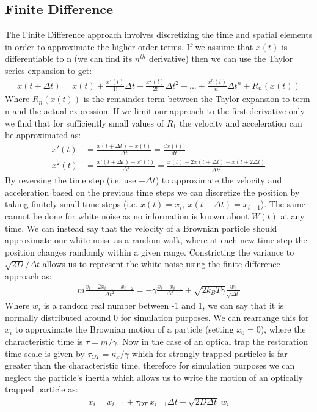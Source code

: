 \subsection{Finite Difference}
The Finite Difference approach involves discretizing the time and spatial elements in order to approximate the higher order terms. If we assume that $x(t)$ is differentiable to n (we can find its $n^{th}$ derivative) then we can use the Taylor series expansion to get:
\begin{align}
	x(t+\Delta t) = x(t)+\frac{x'(t)}{1!}\Delta t + \frac{x^2(t)}{2!}\Delta t^2+...+\frac{x^n(t)}{n!}\Delta t^n+R_n(x(t))	
\end{align}
Where $R_n(x(t))$ is the remainder term between the Taylor expansion to term n and the actual expression. If we limit our approach to the first derivative only we find that for sufficiently small values of $R_1$ the velocity and acceleration can be approximated as:
\begin{align}
	x'(t) &= \frac{x(t+\Delta t)-x(t)}{\Delta t}=\frac{dx(t))}{dt} \\
	x^2(t) &= \frac{x'(t+\Delta t)-x'(t)}{\Delta t} = \frac{x(t)-2x(t+\Delta t)+x(t+2\Delta t)}{\Delta t^2}
\end{align}
By reversing the time step (i.e. use $-\Delta t$) to approximate the velocity and acceleration based on the previous time steps we can discretize the position by taking finitely small  time steps (i.e. $x(t) = x_i,\ x(t-\Delta t) = x_{i-1}$). The same cannot be done for white noise as no information is known about $W(t)$ at any time. We can instead say that the velocity of a Brownian particle should approximate our white noise as a random walk, where at each new time step the position changes randomly within a given range. Constricting the variance to $\sqrt{2D}/\Delta t$ allows us to represent the white noise using the finite-difference approach as:
\begin{align}
	m\frac{x_i-2x_{i-1}+x_{i-2}}{\Delta t^2} = -\gamma\frac{x_i-x_{i-1}}{\Delta t}+\sqrt{2k_BT\gamma}\frac{w_i}{\sqrt{\Delta t}}
\end{align}
Where $w_i$ is a random real number between -1 and 1, we can say that it is normally distributed around 0 for simulation purposes. We can rearrange this for $x_i$ to approximate the Brownian motion of a particle (setting $x_0=0$), where the characteristic time is $\tau = m/\gamma$. Now in the case of an optical trap the restoration time scale is given by $\tau_{OT}=\kappa_x/\gamma$ which for strongly trapped particles is far greater than the characteristic time, therefore for simulation purposes we can neglect the particle's inertia which allows us to write the motion of an optically trapped particle as:
\begin{align}
	\label{eq:sim_langevin}
	x_i = x_{i-1} + \tau_{OT}\ x_{i-1}\Delta t + \sqrt{2D\Delta t}\ w_i
\end{align} 

